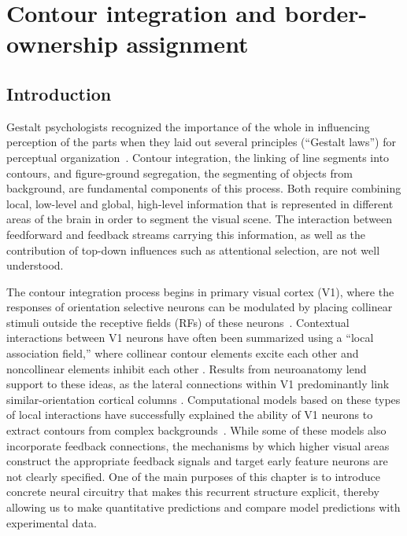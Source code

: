 \chapter{Contour integration and border-ownership assignment}
\label{sec:contour}

\section{Introduction}
\label{intro}

Gestalt psychologists recognized the importance of the whole in influencing perception of the parts when they laid out several
principles (``Gestalt laws'') for perceptual organization~\citep{Wertheimer23,Koffka35}. Contour integration, the
linking of line segments into contours, and figure-ground segregation,
the segmenting of objects from background, are fundamental components
of this process. Both require combining local, low-level and global,
high-level information that is represented in different areas of the brain in order to segment the visual scene. The interaction between feedforward and feedback streams carrying this information, as well as the contribution of top-down influences such as attentional selection, 
are not well understood.

The contour integration process begins in primary visual cortex (V1),
where the responses of orientation selective neurons can be modulated
by placing collinear stimuli outside the receptive fields (RFs) of these neurons~\citep{Stemmler_etal95a,Polat_etal98}.  Contextual
interactions between V1 neurons have often been summarized using a
``local association field,'' where collinear contour elements excite
each other and noncollinear elements inhibit each other \citep{Ullman92, Field_etal93}.  Results from neuroanatomy lend support to these ideas, as the lateral connections within V1 predominantly link similar-orientation cortical columns \citep{Gilbert_Wiesel89,Bosking_etal97,
  Stettler_etal02}. Computational models based on these types of local
interactions have successfully explained the ability of V1 neurons to
extract contours from complex backgrounds~\citep{Li98,Yen_Finkel98,Piech_etal13}. While some of
these models also incorporate feedback connections, the mechanisms by which higher visual areas construct the appropriate feedback signals and target early feature neurons are not clearly specified.  One of the main purposes of
%
this chapter
is to introduce concrete neural circuitry that makes this recurrent structure explicit, thereby allowing us to make quantitative predictions and compare model predictions with experimental data.

